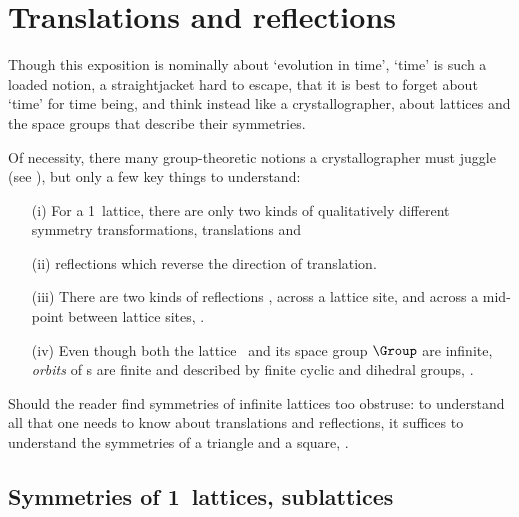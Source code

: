 

\section{Translations and reflections} %
\label{s:latt1d}
                                         \toCB

Though this exposition is nominally about `evolution in time', `time' is
such a loaded notion, a straightjacket hard to escape, that it is best to
forget about `time' for time being, and think instead like a
crystallographer, about lattices and the space groups that describe their
symmetries.

Of necessity, there many group-theoretic notions a crystallographer must
juggle (see ), but only a few key
things to understand:
\begin{itemize}
  \item[(i)]
For a 1\dmn\ lattice, there are only two kinds of qualitatively different
symmetry transformations,
translations 
and
  \item[(ii)]
reflections  which reverse the direction of translation.
  \item[(iii)]
There are two kinds of reflections , across a lattice site,
and across a mid-point between lattice sites, .
  \item[(iv)]
Even though both the lattice \lattice\ and its space group $\Group$ are
infinite, \emph{orbits} of {\lattstate}s are finite and described
by finite cyclic and dihedral groups, .
\end{itemize}
Should the reader find symmetries of infinite lattices too obstruse:
to understand all that one needs to know about translations  and
reflections, it suffices to understand the symmetries of a
triangle and a square, .

\subsection{Symmetries of 1\dmn\ lattices, sublattices}
\label{s:1dLatt}

